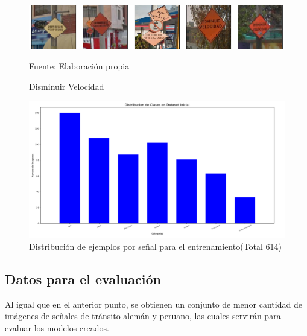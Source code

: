 			\begin{figure}[H]
				\begin{center}
				\includegraphics[width=1\textwidth]{images/desarrollo/imagenes/peru/1__(7).png}
				\end{center}
				\begin{center}
				\caption{\small{Disminuir Velocidad}}
				\vskip -0.25cm
				{\small{Fuente: Elaboración propia}}
				\end{center}
				\vspace{-1.5em}
			\end{figure}
			\vskip 2cm
			\begin{figure}[H]
				\begin{center}
				\includegraphics[width=1\textwidth]{images/desarrollo/histograms/inicioTrain614}
				\end{center}
				\begin{center}
				\caption{\small{Distribución de ejemplos por señal para el entrenamiento(Total 614)}}
				{\small{\fontsize{10}{16.8}\selectfont {Fuente: Elaboración propia}}}
				\end{center}
				\vspace{-1.5em}
			\end{figure}

			

	\subsection{Datos para el evaluación}
		Al igual que en el anterior punto, se obtienen un conjunto de menor cantidad de imágenes de señales de tránsito alemán y peruano, las cuales servirán para evaluar los modelos creados.

